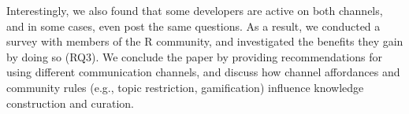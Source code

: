 Interestingly, we also found that some developers are active on both channels, and in some cases, even post the same questions. As a result, we conducted a survey with members of the R community, and investigated the benefits they gain by doing so (RQ3). We conclude the paper by providing recommendations for using different communication channels, and discuss how channel affordances and community rules (e.g., topic restriction, gamification) influence knowledge construction and curation.




